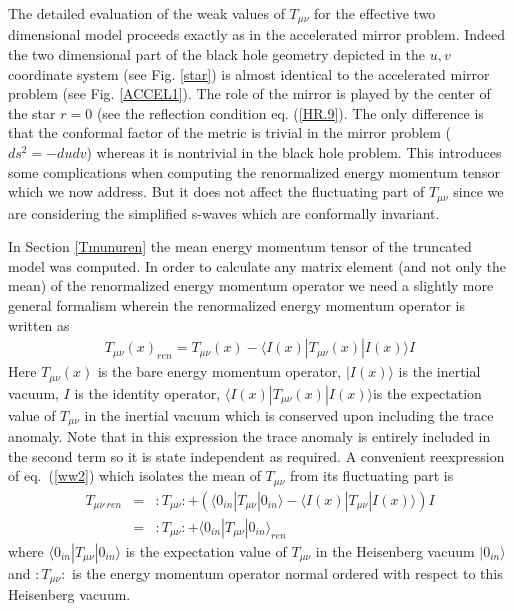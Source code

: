 \documentclass[12pt,oneside]{report}
\def\ket#1{|#1\rangle}
\def\elematrice#1#2#3{\langle #1|#2|#3 \rangle}
\begin{document}
The detailed evaluation of the weak values of $T_{\mu \nu}$ for the effective
two dimensional model proceeds exactly as in the
accelerated mirror problem. Indeed the two dimensional
part of the black hole geometry 
depicted in the $u,v$ coordinate system (see Fig. \ref{star}) 
is almost identical to the
accelerated mirror problem (see Fig. \ref{ACCEL1}). The 
role of the mirror is played by the center
of the star $r=0$ (see the reflection condition eq. (\ref{HR.9}). 
The only difference is that
the conformal factor of the metric is trivial in the mirror problem
($ds^2= -dudv$) whereas it is nontrivial in the black hole problem. This
introduces some complications when computing the renormalized energy
momentum tensor  which we now address. But it does not affect the fluctuating
part of $T_{\mu \nu}$ since we are considering the simplified s-waves which are conformally invariant.

In Section \ref{Tmunuren}  the mean energy momentum tensor of the
truncated model was computed.
In order to calculate any matrix element (and not only the mean) of the
renormalized energy momentum operator 
we need a slightly more general formalism wherein the  renormalized
energy momentum operator is written as
\begin{eqnarray}
 T_{\mu\nu}(x)_{ren} =
 T_{\mu\nu}(x) - \elematrice{I(x)}{  T_{\mu\nu}(x)}{I(x)}I
\label{ww2}\end{eqnarray}
Here $ 
T_{\mu\nu}(x)$ is the bare energy momentum
operator, $\ket{I(x)}$ is the inertial vacuum, 
$I$ is the identity operator, $\elematrice{I(x)}{
 T_{\mu\nu}(x)}{I(x)}$is the expectation value of $T_{\mu\nu}$ in
the inertial vacuum which is conserved upon including the trace anomaly.
Note that in this expression the trace anomaly is entirely included
in the second term so it is state independent as required. A
convenient reexpression of eq.~(\ref{ww2}) which isolates the mean of
$T_{\mu\nu}$ from its fluctuating part is  \begin{eqnarray}
 T_{\mu\nu\ ren}
&=& : \! T_{\mu\nu}\!:
+ \left (\elematrice{0_{in}}{  T_{\mu\nu}}{0_{in}}
-\elematrice{I(x)}{  T_{\mu\nu}}{I(x)} \right)I\nonumber\\
&=& : \! T_{\mu\nu}\!:
+ \elematrice{0_{in}}{  T_{\mu\nu}}{0_{in}}_{ren}
\label{ww3}
\end{eqnarray}
where  
$\elematrice{0_{in}}{  T_{\mu\nu}}{0_{in}}$ is the expectation
value of $ T_{\mu\nu}$ in the Heisenberg vacuum $\ket{0_{in}}$ and $:\! 
T_{\mu\nu}\!:$ is the energy momentum
operator normal ordered with respect to this Heisenberg
vacuum. 
\end{document}
